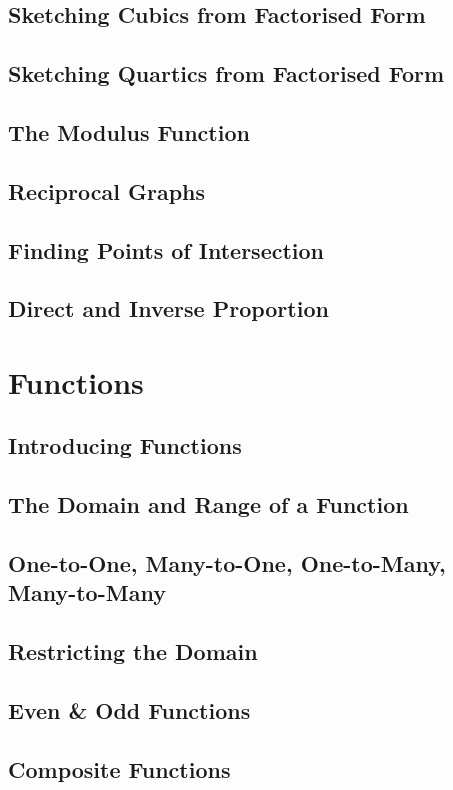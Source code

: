 \documentclass[../maths.tex]{subfiles}
\begin{document}
\subsection*{Sketching Cubics from Factorised Form}
\subsection*{Sketching Quartics from Factorised Form}
\subsection*{The Modulus Function}
\subsection*{Reciprocal Graphs}
\subsection*{Finding Points of Intersection}
\subsection*{Direct and Inverse Proportion}
\section{Functions}
\subsection*{Introducing Functions}
\subsection*{The Domain and Range of a Function}
\subsection*{One-to-One, Many-to-One, One-to-Many, Many-to-Many}
\subsection*{Restricting the Domain}
\subsection*{Even \& Odd Functions}
\subsection*{Composite Functions}
\end{document}
